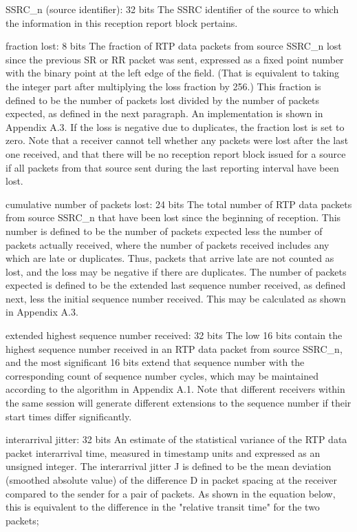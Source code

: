 \documentclass{article}
\begin{document}
SSRC\_n (source identifier): 32 bits The SSRC identifier of the source to which the information in this reception report block pertains.

fraction lost: 8 bits The fraction of RTP data packets from source SSRC\_n lost since the previous SR or RR packet was sent, expressed as a fixed point number with the binary point at the left edge of the field.  (That is equivalent to taking the integer part after multiplying the loss fraction by 256.)  This fraction is defined to be the number of packets lost divided by the number of packets expected, as defined in the next paragraph.  An implementation is shown in Appendix A.3.  If the loss is negative due to duplicates, the fraction lost is set to zero.  Note that a receiver cannot tell whether any packets were lost after the last one received, and that there will be no reception report block issued for a source if all packets from that source sent during the last reporting interval have been lost.

cumulative number of packets lost: 24 bits The total number of RTP data packets from source SSRC\_n that have been lost since the beginning of reception.  This number is defined to be the number of packets expected less the number of packets actually received, where the number of packets received includes any which are late or duplicates.  Thus, packets that arrive late are not counted as lost, and the loss may be negative if there are duplicates.  The number of packets expected is defined to be the extended last sequence number received, as defined next, less the initial sequence number received.  This may be calculated as shown in Appendix A.3.

extended highest sequence number received: 32 bits The low 16 bits contain the highest sequence number received in an RTP data packet from source SSRC\_n, and the most significant 16 bits extend that sequence number with the corresponding count of sequence number cycles, which may be maintained according to the algorithm in Appendix A.1.  Note that different receivers within the same session will generate different extensions to the sequence number if their start times differ significantly.

interarrival jitter: 32 bits An estimate of the statistical variance of the RTP data packet interarrival time, measured in timestamp units and expressed as an unsigned integer.  The interarrival jitter J is defined to be the mean deviation (smoothed absolute value) of the difference D in packet spacing at the receiver compared to the sender for a pair of packets.  As shown in the equation below, this is equivalent to the difference in the "relative transit time" for the two packets;
\end{document}
